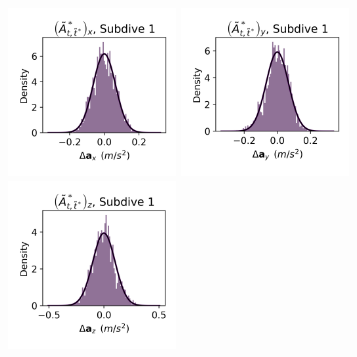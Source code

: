 \documentclass{article}
\begin{document}
        \begin{center}
        \includegraphics[width=1.75in]{../Plots/2019/20190902-182840-CATs_OB_1_0_267_HHMM_empirical_hist_Ax_0.png}
        \includegraphics[width=1.75in]{../Plots/2019/20190902-182840-CATs_OB_1_0_267_HHMM_empirical_hist_Ay_0.png}
        \includegraphics[width=1.75in]{../Plots/2019/20190902-182840-CATs_OB_1_0_267_HHMM_empirical_hist_Az_0.png}
        

\end{center}
\end{document}
